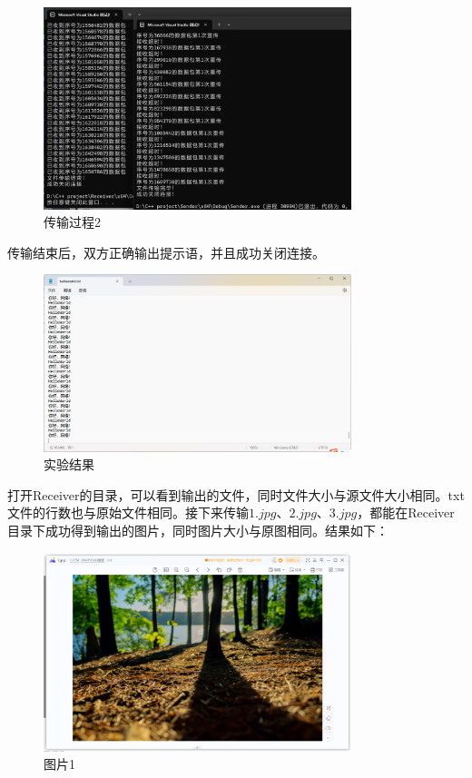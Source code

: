 \documentclass[UTF8,a4paper,10pt]{ctexart}
\begin{document}
\begin{figure}[H]
    \centering
\includegraphics[width=0.8\textwidth]{img/传输过程2.png}
    \caption{传输过程2}
\end{figure}
传输结束后，双方正确输出提示语，并且成功关闭连接。
\begin{figure}[H]
    \centering
\includegraphics[width=0.8\textwidth]{img/实验结果.png}
    \caption{实验结果}
\end{figure}
打开Receiver的目录，可以看到输出的文件，同时文件大小与源文件大小相同。txt文件的行数也与原始文件相同。接下来传输$1.jpg、2.jpg、3.jpg$，都能在Receiver目录下成功得到输出的图片，同时图片大小与原图相同。结果如下：
\begin{figure}[H]
    \centering
\includegraphics[width=0.8\textwidth]{img/图片1.png}
    \caption{图片1}
\end{figure}
\end{document}
